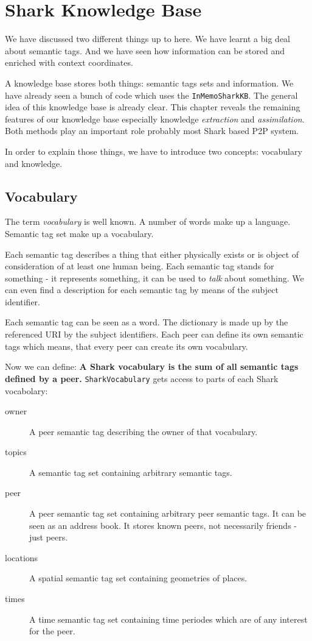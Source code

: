 \chapter{Shark Knowledge Base}
\label{sec:sharkkb}
We have discussed two different things up to here. We have learnt a big deal about semantic tags. And we have seen how information can be stored and enriched with context coordinates.

A knowledge base stores both things: semantic tags sets and information. We have already seen a bunch of code which uses the {\tt InMemoSharkKB}. The general idea of this knowledge base is already clear. This chapter reveals the remaining features of our knowledge base especially knowledge {\it extraction} and {\it assimilation}. Both methods play an important role probably most Shark based P2P system.

In order to explain those things, we have to introduce two concepts: vocabulary and knowledge.

\section{Vocabulary}
The term {\it vocabulary} is well known. A number of words make up a language. Semantic tag set make up a vocabulary.

Each semantic tag describes a thing that either physically exists or is object of consideration of at least one human being. Each semantic tag stands for something - it represents something, it can be used to {\it talk} about something. We can even find a description for each semantic tag by means of the subject identifier. 

Each semantic tag can be seen as a word. The dictionary is made up by the referenced URI by the subject identifiers. Each peer can define its own semantic tags which means, that every peer can create its own vocabulary.

Now we can define: {\bf A Shark vocabulary is the sum of all semantic tags defined by a peer.} {\tt SharkVocabulary} gets access to parts of each Shark vocabolary:

\begin{description}
\item[owner] A peer semantic tag describing the owner of that vocabulary.
\item[topics] A semantic tag set containing arbitrary semantic tags.
\item[peer] A peer semantic tag set containing arbitrary peer semantic tags.
It can be seen as an address book. It stores known peers, not necessarily friends - just peers.
\item[locations] A spatial semantic tag set containing geometries of places.
\item[times] A time semantic tag set containing time periodes which are of any interest for the peer.
\end{description}

